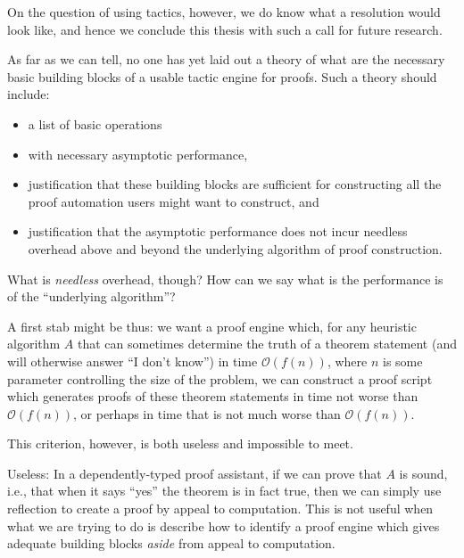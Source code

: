 On the question of using tactics, however, we do know what a resolution would look like, and hence we conclude this thesis with such a call for future research.

As far as we can tell, no one has yet laid out a theory of what are the necessary basic building blocks of a usable tactic engine for proofs.
Such a theory should include:
\begin{itemize}
\item
  a list of basic operations
\item
  with necessary asymptotic performance,
\item
  justification that these building blocks are sufficient for constructing all the proof automation users might want to construct, and
\item
  justification that the asymptotic performance does not incur needless overhead above and beyond the underlying algorithm of proof construction.
\end{itemize}

What is \emph{needless} overhead, though?
How can we say what is the performance is of the ``underlying algorithm''?

A first stab might be thus: we want a proof engine which, for any heuristic algorithm $A$ that can sometimes determine the truth of a theorem statement (and will otherwise answer ``I don't know'') in time $\mathcal O(f(n))$, where $n$ is some parameter controlling the size of the problem, we can construct a proof script which generates proofs of these theorem statements in time not worse than $\mathcal O(f(n))$, or perhaps in time that is not much worse than $\mathcal O(f(n))$.

This criterion, however, is both useless and impossible to meet.

Useless:
In a dependently-typed proof assistant, if we can prove that $A$ is sound, i.e., that when it says ``yes'' the theorem is in fact true, then we can simply use reflection to create a proof by appeal to computation.
This is not useful when what we are trying to do is describe how to identify a proof engine which gives adequate building blocks \emph{aside} from appeal to computation.

